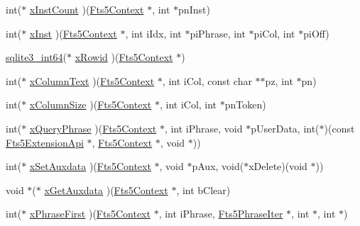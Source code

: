 \begin{DoxyCompactItemize}
\item 
int($\ast$ \hyperlink{struct_fts5_extension_api_af57aff7a8aa8402bb37a77892c4daf45}{x\+Inst\+Count} )(\hyperlink{sqlite3_8h_a97821b95ebebd43db901977ffd5b26bc}{Fts5\+Context} $\ast$, int $\ast$pn\+Inst)
\item 
int($\ast$ \hyperlink{struct_fts5_extension_api_a85e17f20db782b20b503f1d803a47a9e}{x\+Inst} )(\hyperlink{sqlite3_8h_a97821b95ebebd43db901977ffd5b26bc}{Fts5\+Context} $\ast$, int i\+Idx, int $\ast$pi\+Phrase, int $\ast$pi\+Col, int $\ast$pi\+Off)
\item 
\hyperlink{sqlite3_8h_a0a4d3e6c1ad46f90e746b920ab6ca0d2}{sqlite3\+\_\+int64}($\ast$ \hyperlink{struct_fts5_extension_api_acc4336c9f7bf39defa1acbdbf5df0020}{x\+Rowid} )(\hyperlink{sqlite3_8h_a97821b95ebebd43db901977ffd5b26bc}{Fts5\+Context} $\ast$)
\item 
int($\ast$ \hyperlink{struct_fts5_extension_api_a03c7fcd31a751fc34d25e5288045f91d}{x\+Column\+Text} )(\hyperlink{sqlite3_8h_a97821b95ebebd43db901977ffd5b26bc}{Fts5\+Context} $\ast$, int i\+Col, const char $\ast$$\ast$pz, int $\ast$pn)
\item 
int($\ast$ \hyperlink{struct_fts5_extension_api_aefe6eb4685546e58f056a61da39a2bcb}{x\+Column\+Size} )(\hyperlink{sqlite3_8h_a97821b95ebebd43db901977ffd5b26bc}{Fts5\+Context} $\ast$, int i\+Col, int $\ast$pn\+Token)
\item 
int($\ast$ \hyperlink{struct_fts5_extension_api_a8f6dcf0a1d246b235f98f5bbb214e28d}{x\+Query\+Phrase} )(\hyperlink{sqlite3_8h_a97821b95ebebd43db901977ffd5b26bc}{Fts5\+Context} $\ast$, int i\+Phrase, void $\ast$p\+User\+Data, int($\ast$)(const \hyperlink{struct_fts5_extension_api}{Fts5\+Extension\+Api} $\ast$, \hyperlink{sqlite3_8h_a97821b95ebebd43db901977ffd5b26bc}{Fts5\+Context} $\ast$, void $\ast$))
\item 
int($\ast$ \hyperlink{struct_fts5_extension_api_a0f59a6c383a478ed95efdb7e4a95de80}{x\+Set\+Auxdata} )(\hyperlink{sqlite3_8h_a97821b95ebebd43db901977ffd5b26bc}{Fts5\+Context} $\ast$, void $\ast$p\+Aux, void($\ast$x\+Delete)(void $\ast$))
\item 
void $\ast$($\ast$ \hyperlink{struct_fts5_extension_api_a63ba9aaf30fe9fe5fbcd1541ff38abff}{x\+Get\+Auxdata} )(\hyperlink{sqlite3_8h_a97821b95ebebd43db901977ffd5b26bc}{Fts5\+Context} $\ast$, int b\+Clear)
\item 
int($\ast$ \hyperlink{struct_fts5_extension_api_ae2584a3afa2a70504847600e609d43ad}{x\+Phrase\+First} )(\hyperlink{sqlite3_8h_a97821b95ebebd43db901977ffd5b26bc}{Fts5\+Context} $\ast$, int i\+Phrase, \hyperlink{struct_fts5_phrase_iter}{Fts5\+Phrase\+Iter} $\ast$, int $\ast$, int $\ast$)
$$
\end{DoxyCompactItemize}
